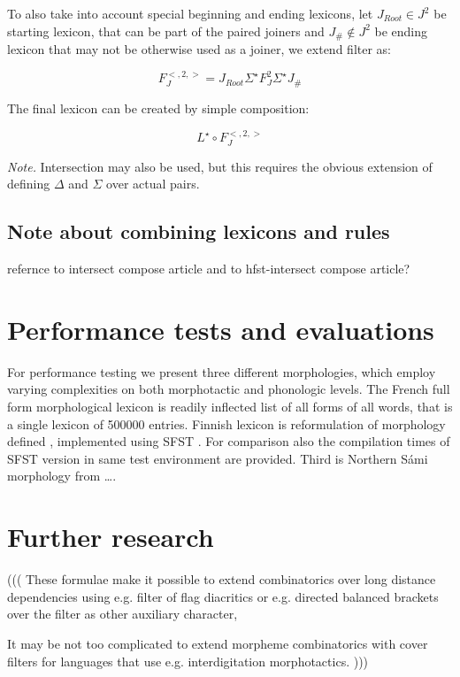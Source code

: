 \documentclass{llncs}
\begin{document}
To also take into account special beginning and ending lexicons, let
$J_{Root} \in J^{2}$ be starting lexicon, that can be part of the paired joiners
and $J_{\#} \notin J^{2}$ be ending lexicon that may not be otherwise used as
a joiner, we extend filter as:

\begin{equation}
F_J^{<,2,>} = J_{Root} \Sigma^{\star} F_J^2 \Sigma^{\star} J_{\#}
\end{equation}

The final lexicon can be created by simple composition:

\begin{equation}
L^{\star} \circ F_J^{<,2,>}
\end{equation}

\emph{Note.} Intersection may also be used, but this requires the obvious
extension of defining $\Delta$ and $\Sigma$ over actual pairs.

\subsection{Note about combining lexicons and rules}

refernce to intersect compose article and to hfst-intersect compose article?

\section{Performance tests and evaluations}

For performance testing we present three different morphologies, which employ
varying complexities on both morphotactic and phonologic levels. The
French full form morphological lexicon is readily inflected list of all
forms of all words, that is a single lexicon of 500000 entries\cite{morphalou}.
Finnish lexicon
is reformulation of morphology defined \cite{pirinen2008}, implemented using
SFST \cite{schmidt2007}.
For comparison also the compilation times of SFST version in same test
environment are provided. Third is Northern S\'{a}mi morphology from \ldots.



\section{Further research}

(((
These formulae make it possible to extend combinatorics over long distance
dependencies using e.g. filter of flag diacritics\cite{} or e.g.
directed balanced brackets over the filter as other auxiliary character,

It may be not too complicated to extend morpheme combinatorics
with cover filters for languages that use e.g. interdigitation morphotactics.
)))



\end{document}
